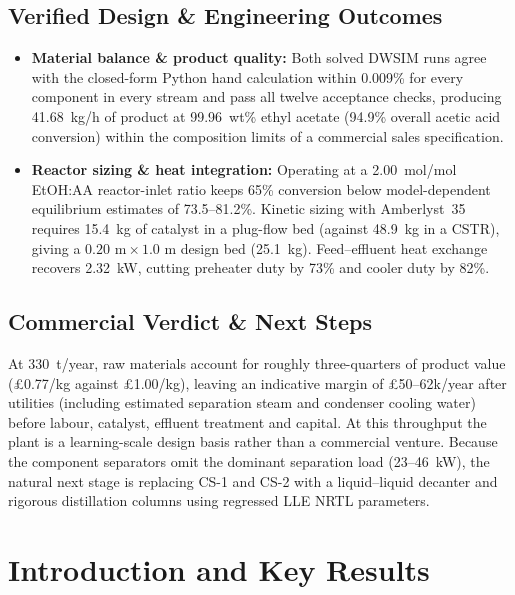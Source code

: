 \documentclass[10pt,a4paper]{article}
\begin{document}
\subsection*{Verified Design \& Engineering Outcomes}
\begin{itemize}
  \item \textbf{Material balance \& product quality:} Both solved DWSIM runs agree with the closed-form Python hand calculation within 0.009\% for every component in every stream and pass all twelve acceptance checks, producing 41.68~kg/h of product at 99.96~wt\% ethyl acetate (94.9\% overall acetic acid conversion) within the composition limits of a commercial sales specification.
  \item \textbf{Reactor sizing \& heat integration:} Operating at a 2.00~mol/mol EtOH:AA reactor-inlet ratio keeps 65\% conversion below model-dependent equilibrium estimates of 73.5--81.2\%. Kinetic sizing with Amberlyst~35 requires 15.4~kg of catalyst in a plug-flow bed (against 48.9~kg in a CSTR), giving a $0.20\text{ m} \times 1.0\text{ m}$ design bed (25.1~kg). Feed--effluent heat exchange recovers 2.32~kW, cutting preheater duty by 73\% and cooler duty by 82\%.
\end{itemize}

\subsection*{Commercial Verdict \& Next Steps}
At 330~t/year, raw materials account for roughly three-quarters of product value (\pounds 0.77/kg against \pounds 1.00/kg), leaving an indicative margin of \pounds 50--62k/year after utilities (including estimated separation steam and condenser cooling water) before labour, catalyst, effluent treatment and capital. At this throughput the plant is a learning-scale design basis rather than a commercial venture. Because the component separators omit the dominant separation load (23--46~kW), the natural next stage is replacing CS-1 and CS-2 with a liquid--liquid decanter and rigorous distillation columns using regressed LLE NRTL parameters.

\newpage

\renewcommand{\contentsname}{Table of Contents}
\tableofcontents
\newpage

\section{Introduction and Key Results}
\end{document}
